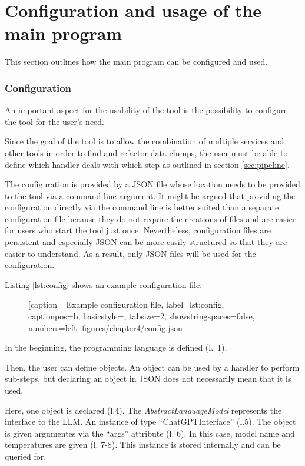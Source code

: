 \section{Configuration and usage of the main program}\label{sec:config}
This section outlines how the main program can be configured and used.

\subsubsection{Configuration}
An important aspect for the usability of the tool is the possibility to configure the tool for the user's need. 

Since the goal of the tool is to allow the combination of multiple services and other tools in order to find and refactor data clumps, the user must be able to define which handler deals with which step  as outlined in section \ref{sec:pipeline}.

The configuration is provided by a \ac{JSON} file whose location needs to be provided to the tool via a command line argument. It might be argued that providing the configuration directly via the command line is better suited than a separate configuration file because they do not require the creations of files and are easier for users who start the tool just once. Nevertheless, configuration files are persistent and especially \ac{JSON} can be more easily structured so that they are easier to understand. As a result, only \ac{JSON} files will be used  for the configuration. 


Listing \ref{lst:config} shows an example configuration file:
  \begin{figure} [htbp!]
			
			[caption={ Example configuration file},
			label={lst:config},
			captionpos=b, basicstyle=\footnotesize, tabsize=2, showstringspaces=false,  numbers=left]
			{figures/chapter4/config.json}
		\end{figure}


In the beginning, the programming language is defined (l.~1). 

Then, the user can define objects. An object can be used by a handler to perform sub-steps, but declaring an object in \ac{JSON} does not necessarily mean that it is used. 

Here, one object is declared (l.4). The \textit{AbstractLanguageModel} represents the interface to the \ac{LLM}.  An instance of type \enquote{ChatGPTInterface} (l.5). The object is given argumentes via the \enquote{args} attribute (l. 6). In this case, model name and temperatures are given (l. 7-8).  This instance is stored internally and can be queried for.   

